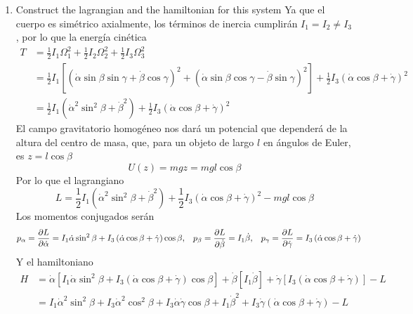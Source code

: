 \documentclass[]{article}
\numberwithin{equation}{section}
\begin{document}
\begin{enumerate}
	\item[a.] Construct the lagrangian and the hamiltonian for this system
	\resp Ya que el cuerpo es simétrico axialmente, los términos de inercia cumplirán $I_1 = I_2 \neq I_3$, por lo que la energía cinética 
	\begin{align*}
		T &= \frac{1}{2}I_1 \Omega_1^2 + \frac{1}{2}I_2 \Omega_2^2 + \frac{1}{2}I_3 \Omega_3^2\\
		&= \frac{1}{2} I_1 \left[\left(\dot{\alpha} \sin\beta \sin\gamma + \dot{\beta} \cos\gamma\right)^2 + \left(\dot{\alpha} \sin\beta \cos\gamma - \dot{\beta} \sin\gamma\right)^2 \right] + \frac{1}{2} I_3 \left(\dot{\alpha} \cos\beta + \dot{\gamma}\right)^2\\
		&= \frac{1}{2} I_1 \left(\dot{\alpha}^2 \sin^2\beta + \dot{\beta}^2 \right) + \frac{1}{2} I_3 \left(\dot{\alpha} \cos\beta + \dot{\gamma}\right)^2
	\end{align*}
	El campo gravitatorio homogéneo nos dará un potencial que dependerá de la altura del centro de masa, que, para un objeto de largo $l$ en ángulos de Euler, es $z = l\cos\beta$
	\begin{equation*}
		U(z) = m g z = m g l\cos\beta
	\end{equation*}
	Por lo que el lagrangiano
	\begin{equation}
		L = \frac{1}{2} I_1 \left(\dot{\alpha}^2 \sin^2\beta + \dot{\beta}^2 \right) + \frac{1}{2} I_3 \left(\dot{\alpha} \cos\beta + \dot{\gamma}\right)^2 - m g l\cos\beta
	\end{equation}
	Los momentos conjugados serán
	\begin{align}
		p_\alpha &= \dfrac{\partial L}{\partial \dot{\alpha}} = I_1\dot{\alpha}\sin^2\beta + I_3\left(\dot{\alpha} \cos\beta + \dot{\gamma}\right)\cos\beta, & p_\beta &= \dfrac{\partial L}{\partial \dot{\beta}} = I_1\dot{\beta}, & p_\gamma &= \dfrac{\partial L}{\partial \dot{\gamma}} = I_3\left(\dot{\alpha} \cos\beta + \dot{\gamma}\right)
	\end{align}
	Y el hamiltoniano
	\begin{align*}
		H &= \dot{\alpha}\left[I_1\dot{\alpha}\sin^2\beta + I_3\left(\dot{\alpha} \cos\beta + \dot{\gamma}\right)\cos\beta\right] + \dot{\beta}\left[I_1\dot{\beta}\right] + \dot{\gamma}\left[I_3\left(\dot{\alpha} \cos\beta + \dot{\gamma}\right)\right] - L\\
		&= I_1\dot{\alpha}^2\sin^2\beta + I_3 \dot{\alpha}^2\cos^2\beta + I_3 \dot{\alpha} \dot{\gamma} \cos\beta + I_1\dot{\beta}^2 + I_3 \dot{\gamma} \left(\dot{\alpha} \cos\beta + \dot{\gamma}\right) - L\\

\end{align*}
\end{enumerate}
\end{document}
